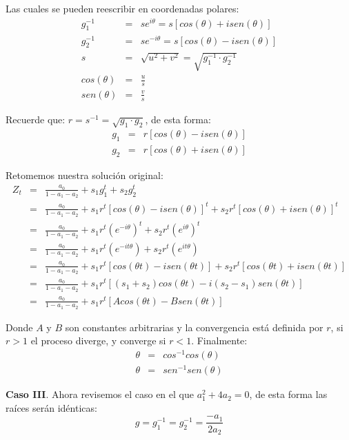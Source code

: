 \documentclass[
]{book}
\begin{document}
Las cuales se pueden reescribir en coordenadas polares:
\begin{eqnarray*}
    g_1^{-1} & = & s e^{i \theta} = s [cos(\theta) + i sen(\theta)] \\
    g_2^{-1} & = & s e^{-i \theta} = s [cos(\theta) - i sen(\theta)] \\
    s & = & \sqrt{u^2 + v^2} = \sqrt{g_1^{-1} \cdot g_2^{-1}} \\
    cos(\theta) & = & \frac{u}{s} \\
    sen(\theta) & = & \frac{v}{s}
\end{eqnarray*}

Recuerde que: \(r = s^{-1} = \sqrt{g_1 \cdot g_2}\), de esta forma:
\begin{eqnarray*}
    g_1 & = & r[cos(\theta) - isen(\theta)] \\
    g_2 & = & r[cos(\theta) + isen(\theta)]
\end{eqnarray*}

Retomemos nuestra solución original:
\begin{eqnarray*}
    Z_t & = & \frac{a_0}{1 - a_1 - a_2} + s_1 g_1^t + s_2 g_2^t \\
    & = & \frac{a_0}{1 - a_1 - a_2} + s_1 r^t[cos(\theta) - isen(\theta)]^t + s_2 r^t[cos(\theta) + isen(\theta)]^t \\
    & = & \frac{a_0}{1 - a_1 - a_2} + s_1 r^t\left(e^{-i \theta}\right)^t + s_2 r^t\left(e^{i \theta}\right)^t \\
    & = & \frac{a_0}{1 - a_1 - a_2} + s_1 r^t\left(e^{-i t \theta}\right) + s_2 r^t\left(e^{i t \theta}\right) \\
    & = & \frac{a_0}{1 - a_1 - a_2} + s_1 r^t[cos(\theta t) - isen(\theta t)] + s_2 r^t[cos(\theta t) + isen(\theta t)] \\
    & = & \frac{a_0}{1 - a_1 - a_2} + s_1 r^t[(s_1 + s_2)cos(\theta t) - i(s_2 - s_1)sen(\theta t)] \\
    & = & \frac{a_0}{1 - a_1 - a_2} + s_1 r^t[A cos(\theta t) - B sen(\theta t)]
\end{eqnarray*}

Donde \(A\) y \(B\) son constantes arbitrarias y la convergencia está definida por \(r\), si \(r>1\) el proceso diverge, y converge si \(r<1\). Finalmente:
\begin{eqnarray*}
    \theta & = & cos^{-1}cos(\theta) \\
    \theta & = & sen^{-1}sen(\theta)
\end{eqnarray*}

\textbf{Caso III}. Ahora revisemos el caso en el que \(a_1^2 + 4a_2 = 0\), de esta forma las raíces serán idénticas:
\begin{equation}
    g = g_1^{-1} = g_2^{-1} = \frac{-a_1}{2 a_2}
    \label{eq:Conver6}
\end{equation}
\end{document}
